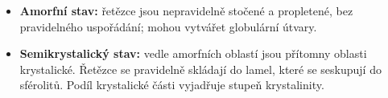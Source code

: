 \begin{itemize}
\item \textbf{Amorfní stav:} řetězce jsou nepravidelně stočené a propletené, bez pravidelného uspořádání; mohou vytvářet globulární útvary.
\item \textbf{Semikrystalický stav:} vedle amorfních oblastí jsou přítomny oblasti krystalické. Řetězce se pravidelně skládají do lamel, které se seskupují do sférolitů. Podíl krystalické části vyjadřuje stupeň krystalinity.
\end{itemize}
